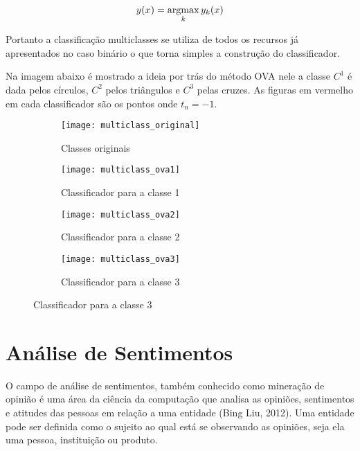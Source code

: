 \begin{center}
	\begin{equation}
		y(x) = \operatorname*{argmax}_{k} y_k(x)
	\end{equation}
\end{center}

Portanto a classificação multiclasses se utiliza de todos os recursos já apresentados no caso
binário o que torna simples a construção do classificador.

Na imagem abaixo é mostrado a ideia por trás do método OVA nele a classe $C^1$ é dada pelos círculos,
$C^2$ pelos triângulos e $C^3$ pelas cruzes.
As figuras em vermelho em cada classificador são os pontos onde $t_n = -1$.

\begin{figure}[ht] 
  \begin{subfigure}[b]{0.5\linewidth}
    \centering
    \texttt{[image: multiclass\_original]} 
    \caption{Classes originais} 
    \vspace{4ex}
  \end{subfigure}%
  \begin{subfigure}[b]{0.5\linewidth}
    \centering
    \texttt{[image: multiclass\_ova1]} 
    \caption{Classificador para a classe 1} 
    \vspace{4ex}
  \end{subfigure} 
  \begin{subfigure}[b]{0.5\linewidth}
    \centering
    \texttt{[image: multiclass\_ova2]} 
    \caption{Classificador para a classe 2} 
  \end{subfigure}%
  \begin{subfigure}[b]{0.5\linewidth}
    \centering
    \texttt{[image: multiclass\_ova3]} 
    \caption{Classificador para a classe 3} 
  \end{subfigure} 

\end{figure}

\section{Análise de Sentimentos}

O campo de análise de sentimentos, também conhecido como mineração de opinião é uma área da
ciência da computação que analisa as opiniões, sentimentos e atitudes das pessoas em relação
a uma entidade (Bing Liu, 2012)\citep{bingliu2012}. Uma entidade pode ser definida como o sujeito ao qual está
se observando as opiniões, seja ela uma pessoa, instituição ou produto.

